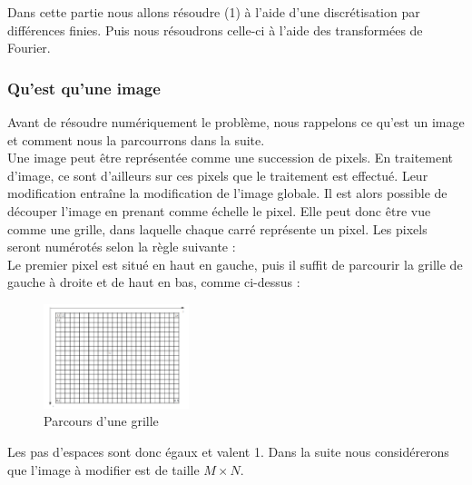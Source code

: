 Dans cette partie nous allons résoudre (1) à l'aide d'une discrétisation par différences finies. Puis nous résoudrons celle-ci à l'aide des transformées de Fourier. \\
\subsubsection{Qu'est qu'une image}
Avant de résoudre numériquement le problème, nous rappelons ce qu'est un image et comment nous la  parcourrons dans la suite.\\
Une image peut être représentée comme une succession de pixels. En traitement d'image, ce sont d'ailleurs sur ces pixels que le traitement est effectué. Leur modification entraîne la modification de l'image globale. Il est alors possible de découper l'image en prenant comme échelle le pixel. Elle peut donc être vue comme une grille, dans laquelle chaque carré représente un pixel. Les pixels seront numérotés selon la règle suivante : \\

Le premier pixel est situé en haut en gauche, puis il suffit de parcourir la grille de gauche à droite et de haut en bas, comme ci-dessus :  
\begin{figure}[!h]
     \centering
     \includegraphics[width = 120pt]{Images/grille.png}
	\caption{Parcours d'une grille}
\end{figure}

Les pas d'espaces sont donc égaux et valent 1. Dans la suite nous considérerons que l'image à modifier est de taille $M \times N$.

